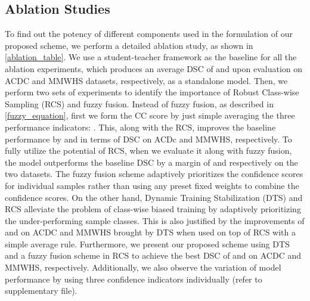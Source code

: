 \documentclass[runningheads]{llncs}
\begin{document}
\subsection{Ablation Studies}
To find out the potency of different components used in the formulation of our proposed scheme, we perform a detailed ablation study, as shown in \autoref{ablation_table}. We use a student-teacher framework as the baseline for all the ablation experiments, which produces an average DSC of  and  upon evaluation on ACDC and MMWHS datasets, respectively, as a standalone model. Then, we perform two sets of experiments to identify the importance of Robust Class-wise Sampling (RCS) and fuzzy fusion. Instead of fuzzy fusion, as described in \autoref{fuzzy_equation}, first we form the CC score by just simple averaging the three performance indicators: . This, along with the RCS, improves the baseline performance by  and  in terms of DSC on ACDc and MMWHS, respectively. To fully utilize the potential of RCS, when we evaluate it along with fuzzy fusion, the model outperforms the baseline DSC by a margin of  and  respectively on the two datasets. The fuzzy fusion scheme adaptively prioritizes the confidence scores for individual samples rather than using any preset fixed weights to combine the confidence scores. On the other hand, Dynamic Training Stabilization (DTS) and RCS alleviate the problem of class-wise biased training by adaptively prioritizing the under-performing sample classes. This is also justified by the improvements of  and  on ACDC and MMWHS brought by DTS when used on top of RCS with a simple average rule. Furthermore, we present our proposed scheme using DTS and a fuzzy fusion scheme in RCS to achieve the best DSC of  and  on ACDC and MMWHS, respectively. Additionally, we also observe the variation of model performance by using three confidence indicators individually (refer to supplementary file).          
\end{document}
